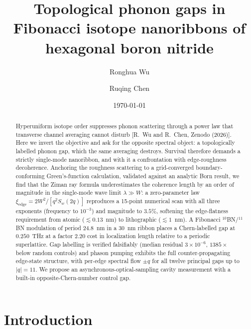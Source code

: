 \documentclass[aps,prl,preprint,superscriptaddress,longbibliography]{revtex4-2}
\begin{document}
\title{Topological phonon gaps in Fibonacci isotope nanoribbons of hexagonal boron nitride}

\author{Ronghua Wu}
\author{Ruqing Chen}

\date{\today}

\begin{abstract}
Hyperuniform isotope order suppresses phonon scattering through a power law
that transverse channel averaging cannot disturb [R.~Wu and R.~Chen, Zenodo
(2026)]. Here we invert the objective and ask for the opposite spectral
object: a topologically labelled phonon gap, which the same averaging
destroys. Survival therefore demands a strictly single-mode nanoribbon, and
with it a confrontation with edge-roughness decoherence. Anchoring the
roughness scattering to a grid-converged boundary-conforming Green's-function
calculation, validated against an analytic Born result, we find that the
Ziman ray formula underestimates the coherence length by an order of
magnitude in the single-mode wave limit $\lambda \gg W$: a zero-parameter law
$\xi_{\mathrm{edge}} = 2W^2/[q^2 S_w(2q)]$ reproduces a 15-point numerical
scan with all three exponents (frequency to $10^{-3}$) and magnitude to $3.5\%$, softening the edge-flatness requirement
from atomic ($\lesssim 0.13$~nm) to lithographic ($\lesssim 1$~nm). A
Fibonacci $^{10}$BN/$^{11}$BN modulation of period $24.8$~nm in a $30$~nm
ribbon places a Chern-labelled gap at $0.250$~THz at a factor $2.20$ cost in
localization length relative to a periodic superlattice. Gap labelling is
verified falsifiably (median residual $3\times10^{-6}$, $1385\times$ below
random controls) and phason pumping exhibits the full counter-propagating
edge-state structure, with per-edge spectral flow $\pm q$ for all twelve
principal gaps up to $|q| = 11$. We propose an asynchronous-optical-sampling
cavity measurement with a built-in opposite-Chern-number control gap.
\end{abstract}

\maketitle

\section{Introduction}
\end{document}
